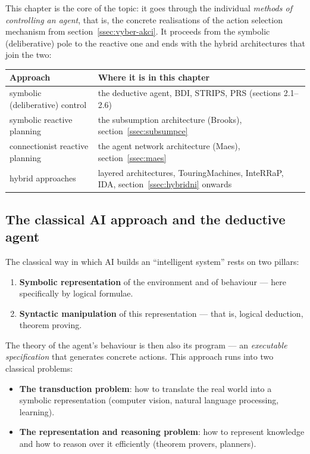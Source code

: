 \documentclass[11pt,a4paper]{article}
\theoremstyle{definition}
\providecommand{\uv}[1]{``#1''}
\begin{document}
This chapter is the core of the topic: it goes through the individual \emph{methods of
controlling an agent}, that is, the concrete realisations of the action selection mechanism from
section~\ref{ssec:vyber-akci}. It proceeds from the symbolic (deliberative) pole to the reactive
one and ends with the hybrid architectures that join the two:

\begin{center}
\small
\begin{tabular}{@{}p{} p{}@{}}
\toprule
\textbf{Approach} & \textbf{Where it is in this chapter} \\
\midrule
symbolic (deliberative) control
  & the deductive agent, BDI, STRIPS, PRS (sections 2.1--2.6) \\
symbolic reactive planning
  & the subsumption architecture (Brooks), section~\ref{ssec:subsumpce} \\
connectionist reactive planning
  & the agent network architecture (Maes), section~\ref{ssec:maes} \\
hybrid approaches
  & layered architectures, TouringMachines, InteRRaP, IDA, section~\ref{ssec:hybridni} onwards \\
\bottomrule
\end{tabular}
\end{center}
\subsection{The classical AI approach and the deductive agent}

The classical way in which AI builds an \uv{intelligent system} rests on two pillars:
\begin{enumerate}
\item \textbf{Symbolic representation} of the environment and of behaviour --- here specifically by
  logical formulae.
\item \textbf{Syntactic manipulation} of this representation --- that is, logical deduction,
  theorem proving.
\end{enumerate}
The theory of the agent's behaviour is then also its program --- an \emph{executable specification}
that generates concrete actions. This approach runs into two classical problems:
\begin{itemize}
\item \textbf{The transduction problem}: how to translate the real world into a symbolic
  representation (computer vision, natural language processing, learning).
\item \textbf{The representation and reasoning problem}: how to represent knowledge and how to
  reason over it efficiently (theorem provers, planners).
\end{itemize}
\end{document}
